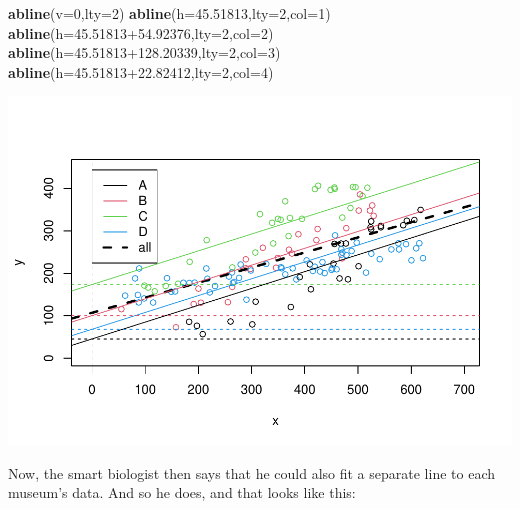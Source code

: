 \documentclass[
]{book}
\newenvironment{Shaded}{\begin{snugshade}}{\end{snugshade}}
\newcommand{\AttributeTok}[1]{\textcolor[rgb]{0.13,0.29,0.53}{#1}}
\newcommand{\DecValTok}[1]{\textcolor[rgb]{0.00,0.00,0.81}{#1}}
\newcommand{\FloatTok}[1]{\textcolor[rgb]{0.00,0.00,0.81}{#1}}
\newcommand{\FunctionTok}[1]{\textcolor[rgb]{0.13,0.29,0.53}{\textbf{#1}}}
\newcommand{\NormalTok}[1]{#1}
\begin{document}
\begin{Shaded}
\begin{Highlighting}[]
\FunctionTok{abline}\NormalTok{(}\AttributeTok{v=}\DecValTok{0}\NormalTok{,}\AttributeTok{lty=}\DecValTok{2}\NormalTok{)}
\FunctionTok{abline}\NormalTok{(}\AttributeTok{h=}\FloatTok{45.51813}\NormalTok{,}\AttributeTok{lty=}\DecValTok{2}\NormalTok{,}\AttributeTok{col=}\DecValTok{1}\NormalTok{)}
\FunctionTok{abline}\NormalTok{(}\AttributeTok{h=}\FloatTok{45.51813+54.92376}\NormalTok{,}\AttributeTok{lty=}\DecValTok{2}\NormalTok{,}\AttributeTok{col=}\DecValTok{2}\NormalTok{)}
\FunctionTok{abline}\NormalTok{(}\AttributeTok{h=}\FloatTok{45.51813+128.20339}\NormalTok{,}\AttributeTok{lty=}\DecValTok{2}\NormalTok{,}\AttributeTok{col=}\DecValTok{3}\NormalTok{)}
\FunctionTok{abline}\NormalTok{(}\AttributeTok{h=}\FloatTok{45.51813+22.82412}\NormalTok{,}\AttributeTok{lty=}\DecValTok{2}\NormalTok{,}\AttributeTok{col=}\DecValTok{4}\NormalTok{)}
\end{Highlighting}
\end{Shaded}

\includegraphics{ECOMODbook_files/figure-latex/a7.14-1.pdf}

Now, the smart biologist then says that he could also fit a separate line to each museum's data. And so he does, and that looks like this:
\end{document}
